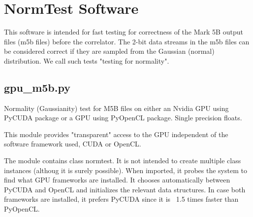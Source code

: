 \documentclass[letterpaper,twoside,12pt]{article}
\begin{document}

\section{NormTest Software}

This software is intended for fast testing for correctness of the Mark 5B output
files (m5b files) before the correlator. The 2-bit data streams in the m5b files
can be considered correct if they are sampled from the Gaussian (normal)
distribution. We call such tests "testing for normality".

\subsection{gpu\_m5b.py}

Normality (Gaussianity) test for M5B files on either an Nvidia GPU using PyCUDA
package or a GPU using PyOpenCL package. Single precision floats.

This module provides "transparent" access to the GPU independent of the
software framework used, CUDA or OpenCL.

The module contains class normtest. It is not intended to create multiple
class instances (althoug it is surely possible). When imported, it 
probes the system to find what GPU frameworks are installed. It chooses
automatically between PyCUDA and OpenCL and initializes the relevant 
data structures. In case both frameworks are installed, it prefers
PyCUDA since it is ~1.5 times faster than PyOpenCL. \\
\end{document}
